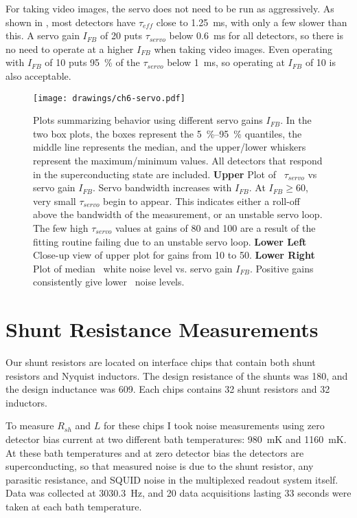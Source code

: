 For taking video images, the servo does not need to be run as aggressively.
As shown in , most detectors have $\tau_{eff}$ close to \SI{1.25}{\ms}, with only a few slower than this.
A servo gain $I_{FB}$ of 20 puts $\tau_{servo}$ below \SI{0.6}{\ms} for all detectors, so there is no need to operate at a higher $I_{FB}$ when taking video images.
Even operating with $I_{FB}$ of 10 puts \SI{95}{\percent} of the $\tau_{servo}$ below \SI{1}{\ms}, so operating at $I_{FB}$ of 10 is also acceptable.

\begin{figure*}
\texttt{[image: drawings/ch6-servo.pdf]}
\caption[Plots summarizing behavior using different servo gains $I_{FB}$]{
  Plots summarizing behavior using different servo gains $I_{FB}$.
  In the two box plots, the boxes represent the \SIrange{5}{95}{\percent} quantiles, the middle line represents the median, and the upper/lower whiskers represent the maximum/minimum values.
All detectors that respond in the superconducting state are included.
\textbf{Upper} Plot of \SQUID\ $\tau_{servo}$ vs servo gain $I_{FB}$.
Servo bandwidth increases with $I_{FB}$.
At $I_{FB} \ge \num{60}$, very small $\tau_{servo}$ begin to appear. This indicates either a roll-off above the bandwidth of the measurement, or an unstable servo loop.
The few high $\tau_{servo}$ values at gains of 80 and 100 are a result of the fitting routine failing due to an unstable servo loop.
\textbf{Lower Left} Close-up view of upper plot for gains from 10 to 50.
\textbf{Lower Right} Plot of median \SQUID\ white noise level vs. servo gain $I_{FB}$. Positive gains consistently give lower \SQUID\ noise levels.
}
\label{fig:ch6-servo}
\end{figure*}

\section{Shunt Resistance Measurements}\label{sec:shunt-nyquist}

%
%

Our shunt resistors are located on interface chips that contain both shunt resistors and Nyquist inductors.
The design resistance of the shunts was \SI{180}{\uOhm}, and the design inductance was \SI{609}{\nH}.
Each chips contains 32 shunt resistors and 32 inductors.

To measure $R_{sh}$ and $L$ for these chips I took noise measurements using zero detector bias current at two different bath temperatures: 980~mK and 1160~mK.
At these bath temperatures and at zero detector bias the detectors are superconducting, so that measured noise is due to the shunt resistor, any parasitic resistance, and SQUID noise in the multiplexed readout system itself.
Data was collected at 3030.3~Hz, and 20 data acquisitions lasting 33 seconds were taken at each bath temperature.

